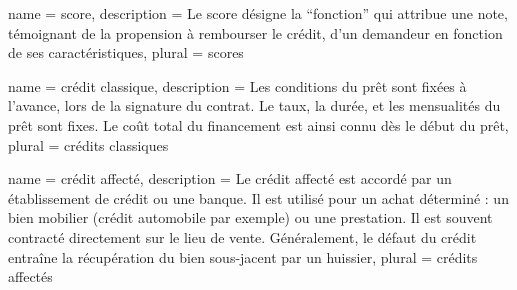 























{
	name = score,
	description = {Le score désigne la ``fonction'' qui attribue une note, témoignant de la propension à rembourser le crédit, d'un demandeur en fonction de ses caractéristiques},
	plural = scores
}



{
	name = crédit classique,
	description = {Les conditions du prêt sont fixées à l’avance, lors de la signature du contrat. Le taux, la durée, et les mensualités du prêt sont fixes. Le coût total du financement est ainsi connu dès le début du prêt},
	plural = crédits classiques
}

{
	name = crédit affecté,
	description = {Le crédit affecté est accordé par un établissement de crédit ou une banque. Il est utilisé pour un achat déterminé : un bien mobilier (crédit automobile par exemple) ou une prestation. Il est souvent contracté directement sur le lieu de vente. Généralement, le défaut du crédit entraîne la récupération du bien sous-jacent par un huissier},
	plural = crédits affectés
}


